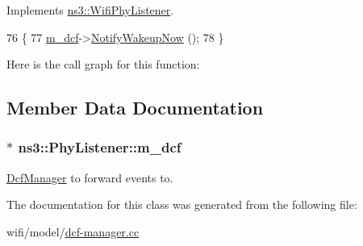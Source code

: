 Implements \hyperlink{classns3_1_1WifiPhyListener_a02bc92f44d0f770bc0b340e8ebbd6f32}{ns3\+::\+Wifi\+Phy\+Listener}.


\begin{DoxyCode}
76   \{
77     \hyperlink{classns3_1_1PhyListener_a62c11708d5c03a853a70abb0318e3ead}{m\_dcf}->\hyperlink{classns3_1_1DcfManager_a6a47134f32caf4b02af6444435bc9197}{NotifyWakeupNow} ();
78   \}
\end{DoxyCode}


Here is the call graph for this function\+:




\subsection{Member Data Documentation}
\subsubsection[{\texorpdfstring{m\+\_\+dcf}{m_dcf}}]{$\ast$ ns3\+::\+Phy\+Listener\+::m\+\_\+dcf\hspace{0.3cm}{\ttfamily [private]}}\hypertarget{classns3_1_1PhyListener_a62c11708d5c03a853a70abb0318e3ead}{}\label{classns3_1_1PhyListener_a62c11708d5c03a853a70abb0318e3ead}


\hyperlink{classns3_1_1DcfManager}{Dcf\+Manager} to forward events to. 



The documentation for this class was generated from the following file\+:\begin{DoxyCompactItemize}
\item 
wifi/model/\hyperlink{dcf-manager_8cc}{dcf-\/manager.\+cc}\end{DoxyCompactItemize}
